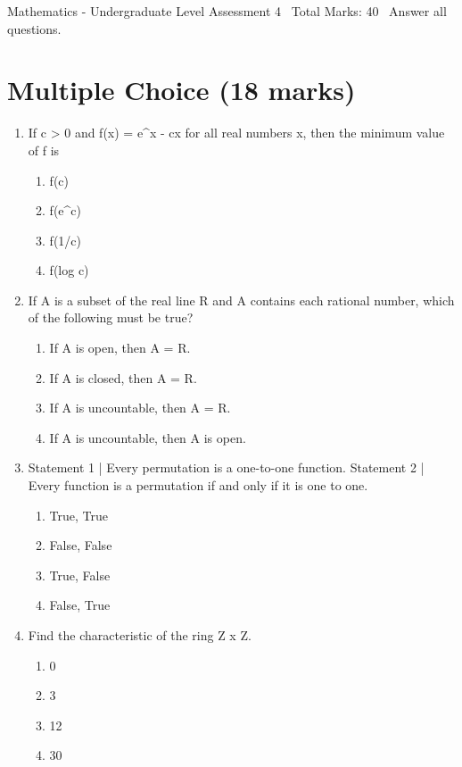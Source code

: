 \documentclass[12pt]{article}
\begin{document}
\begin{center}
Mathematics - Undergraduate Level Assessment 4 \
Total Marks: 40 \
Answer all questions.
\end{center}

\section*{Multiple Choice (18 marks)}
\begin{enumerate}[label=\arabic*.]
\item If c \textgreater{} 0 and f(x) = e\^{}x - cx for all real numbers x, then the minimum value of f is
\begin{enumerate}[label=(\alph*)]
    \item f(c)
    \item f(e\^{}c)
    \item f(1/c)
    \item f(log c)
\end{enumerate}
\item If A is a subset of the real line R and A contains each rational number, which of the following must be true?
\begin{enumerate}[label=(\alph*)]
    \item If A is open, then A = R.
    \item If A is closed, then A = R.
    \item If A is uncountable, then A = R.
    \item If A is uncountable, then A is open.
\end{enumerate}
\item Statement 1 | Every permutation is a one-to-one function. Statement 2 | Every function is a permutation if and only if it is one to one.
\begin{enumerate}[label=(\alph*)]
    \item True, True
    \item False, False
    \item True, False
    \item False, True
\end{enumerate}
\item Find the characteristic of the ring Z x Z.
\begin{enumerate}[label=(\alph*)]
    \item 0
    \item 3
    \item 12
    \item 30
\end{enumerate}

\end{enumerate}
\end{document}
